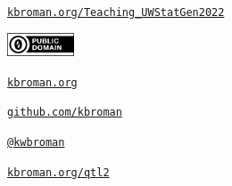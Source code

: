 \documentclass[aspectratio=169,12pt,t]{beamer}
\begin{document}
\begin{frame}[c]{}

\Large

\href{https://kbroman.org/Teaching_UWStatGen2022}{\tt kbroman.org/Teaching\_UWStatGen2022}

\vspace*{-7mm}
\hfill
\href{https://creativecommons.org/publicdomain/zero/1.0/}{\includegraphics[height=7mm]{Figs/cc-zero.png}}

\vspace{3mm}

\href{https://kbroman.org}{\tt \lolit kbroman.org}

\vspace{4mm}

\href{https://github.com/kbroman}{\tt \lolit github.com/kbroman}

\vspace{4mm}

\href{https://twitter.com/kwbroman}{\tt \lolit @kwbroman}

\vspace{4mm}

\href{https://kbroman.org/qtl2}{\tt \lolit kbroman.org/qtl2}





\end{frame}
\end{document}
